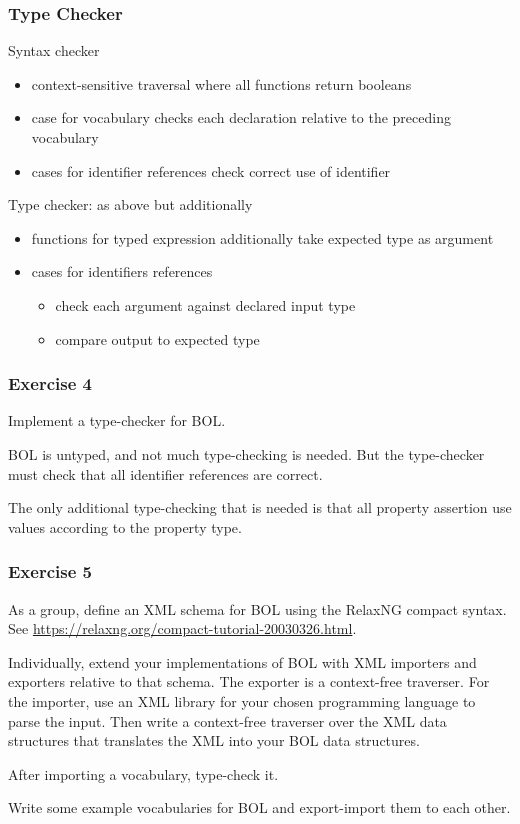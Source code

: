 \begin{frame}\frametitle{Type Checker}
Syntax checker
\begin{itemize}
 \item context-sensitive traversal where all functions return booleans
 \item case for vocabulary checks each declaration relative to the preceding vocabulary
 \item cases for identifier references check correct use of identifier
\end{itemize}

Type checker: as above but additionally
\begin{itemize}
 \item functions for typed expression additionally take expected type as argument
 \item cases for identifiers references
   \begin{itemize}
   \item check each argument against declared input type
   \item compare output to expected type
   \end{itemize}
\end{itemize}
\end{frame}

\begin{frame}\frametitle{Exercise 4}
Implement a type-checker for BOL.

BOL is untyped, and not much type-checking is needed.
But the type-checker must check that all identifier references are correct.

The only additional type-checking that is needed is that all property assertion use values according to the property type.
\end{frame}

\begin{frame}\frametitle{Exercise 5}
As a group, define an XML schema for BOL using the RelaxNG compact syntax. See \url{https://relaxng.org/compact-tutorial-20030326.html}.

Individually, extend your implementations of BOL with XML importers and exporters relative to that schema.
The exporter is a context-free traverser.
For the importer, use an XML library for your chosen programming language to parse the input. Then write a context-free traverser over the XML data structures that translates the XML into your BOL data structures.

After importing a vocabulary, type-check it.

Write some example vocabularies for BOL and export-import them to each other.
\end{frame}

%
